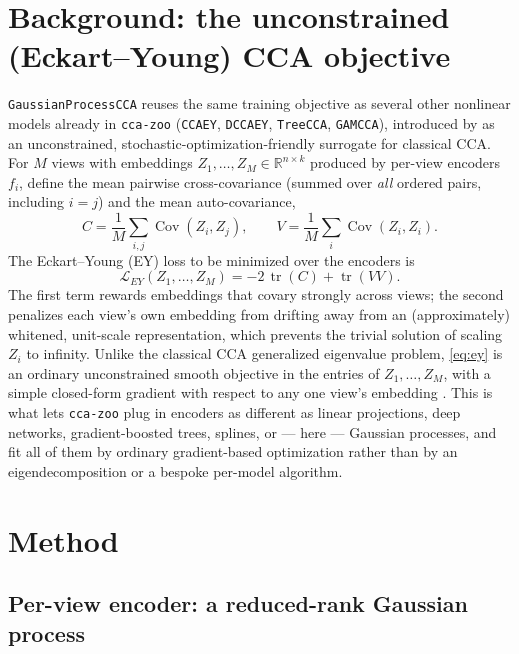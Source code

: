 \documentclass[11pt]{article}
\newcommand{\R}{\mathbb{R}}
\newcommand{\tr}{\operatorname{tr}}
\begin{document}
\section{Background: the unconstrained (Eckart--Young) CCA objective}
\label{sec:ey}

\texttt{GaussianProcessCCA} reuses the same training objective as several other nonlinear models already in \texttt{cca-zoo} (\texttt{CCAEY}, \texttt{DCCAEY}, \texttt{TreeCCA}, \texttt{GAMCCA}), introduced by \citet{chapman2024unconstrained} as an unconstrained, stochastic-optimization-friendly surrogate for classical CCA. For $M$ views with embeddings $Z_1,\dots,Z_M \in \R^{n\times k}$ produced by per-view encoders $f_i$, define the mean pairwise cross-covariance (summed over \emph{all} ordered pairs, including $i=j$) and the mean auto-covariance,
\[
C = \frac1M \sum_{i,j} \operatorname{Cov}(Z_i, Z_j), \qquad V = \frac1M \sum_i \operatorname{Cov}(Z_i, Z_i).
\]
The Eckart--Young (EY) loss to be minimized over the encoders is
\begin{equation}
\mathcal{L}_{EY}(Z_1,\dots,Z_M) = -2\,\tr(C) + \tr(VV).
\label{eq:ey}
\end{equation}
The first term rewards embeddings that covary strongly across views; the second penalizes each view's own embedding from drifting away from an (approximately) whitened, unit-scale representation, which prevents the trivial solution of scaling $Z_i$ to infinity. Unlike the classical CCA generalized eigenvalue problem, \eqref{eq:ey} is an ordinary unconstrained smooth objective in the entries of $Z_1,\dots,Z_M$, with a simple closed-form gradient with respect to any one view's embedding \citep{chapman2024unconstrained}. This is what lets \texttt{cca-zoo} plug in encoders as different as linear projections, deep networks, gradient-boosted trees, splines, or --- here --- Gaussian processes, and fit all of them by ordinary gradient-based optimization rather than by an eigendecomposition or a bespoke per-model algorithm.

\section{Method}

\subsection{Per-view encoder: a reduced-rank Gaussian process}
\label{sec:encoder}
\end{document}
